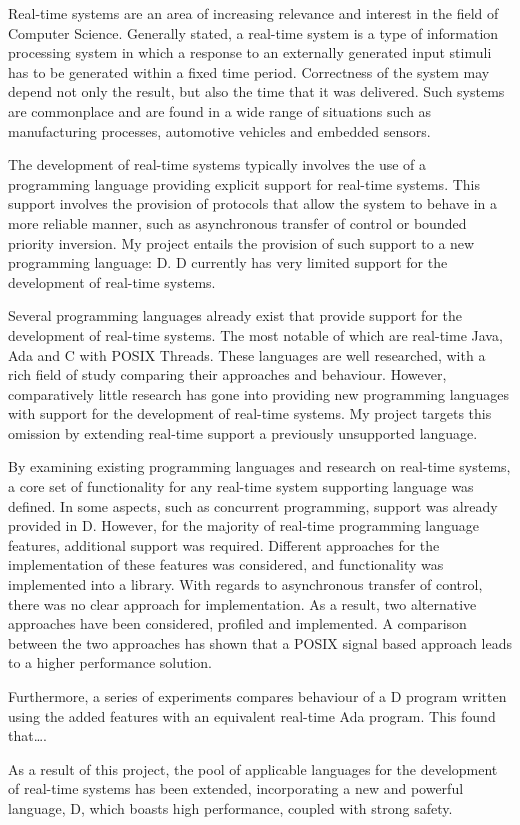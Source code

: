 
Real-time systems are an area of increasing relevance and interest in the field 
of Computer Science. Generally stated, a real-time system is a type of information 
processing system in which a response to an externally generated input stimuli 
has to be generated within a fixed time period. Correctness of the 
system may depend not only the result, but also the time that it was delivered. 
Such systems are commonplace and are found in a wide range of 
situations such as manufacturing processes, automotive vehicles and embedded 
sensors.
\par\bigskip\noindent
The development of real-time systems typically involves the use of a programming 
language providing explicit support for real-time systems. 
This support involves the provision of protocols that allow the system to 
behave in a more reliable manner, such as asynchronous transfer of control or 
bounded priority inversion. 
My project entails the provision of such support to a new programming language: 
D. D currently has very limited support for the development of real-time systems. 
\par\bigskip\noindent
Several programming languages already exist that provide support for the 
development of real-time systems. The most notable of which are 
real-time Java, Ada and C with POSIX Threads. These languages are well researched, 
with a rich field of study comparing their approaches and behaviour. 
However, comparatively little research has gone into providing new programming 
languages with support for the development of real-time systems. My project 
targets this omission by extending real-time support a previously unsupported 
language.
\par\bigskip\noindent
By examining existing programming languages and research on real-time systems, a core set 
of functionality for any real-time system supporting language was defined. 
In some aspects, such as concurrent programming, support was already provided in D. 
However, for the majority of real-time programming language features,
additional support was required. Different approaches for the implementation 
of these features was considered, and functionality was implemented into 
a library. With regards to asynchronous transfer of control, there was no clear 
approach for implementation. As a result, two alternative approaches have 
been considered, profiled and implemented. A comparison between the two approaches 
has shown that a POSIX signal based approach leads to a higher performance 
solution. 
\par\bigskip\noindent
Furthermore, a series of experiments compares behaviour of a D program written 
using the added features with an equivalent real-time Ada program. This found 
that\ldots. 
\par\bigskip\noindent
As a result of this project, the pool of applicable languages for the development 
of real-time systems has been extended, incorporating a new and powerful language, D, which 
boasts high performance, coupled with strong safety. 


